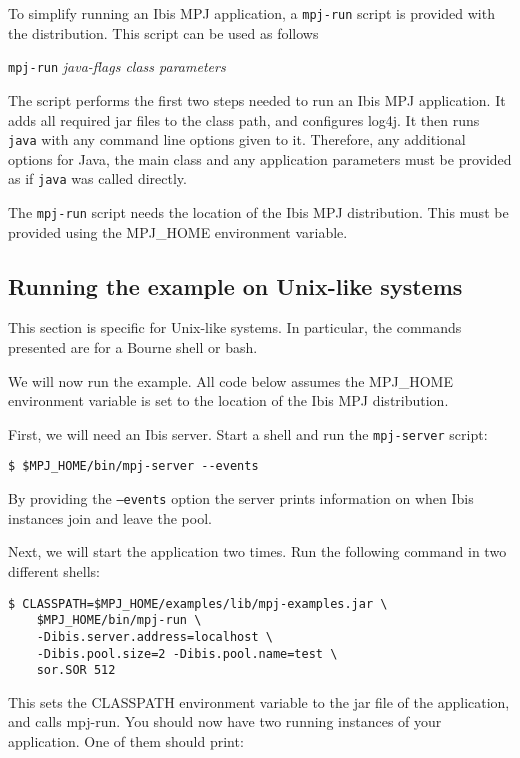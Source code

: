 \documentclass[a4paper,10pt]{article}
\begin{document}
To simplify running an Ibis MPJ application, a \texttt{mpj-run} script is
provided with the distribution. This script can be
used as follows

\begin{center}
\texttt{mpj-run} \emph{java-flags class parameters}
\end{center}

The script performs the first two steps needed to run an Ibis MPJ application.
It adds all required jar files
to the class path, and configures log4j.
It then runs \texttt{java} with any
command line options given to it. Therefore, any additional options for
Java, the main class and any application parameters must be provided as
if \texttt{java} was called directly.

The \texttt{mpj-run} script needs the location of the Ibis MPJ
distribution. This must be provided using the MPJ\_HOME environment
variable.

\subsection{Running the example on Unix-like systems}

This section is specific for Unix-like systems. In particular, the
commands presented are for a Bourne shell or bash.

We will now run the example. All code below assumes the MPJ\_HOME
environment variable is set to the location of the Ibis MPJ distribution.

First, we will need an Ibis server. Start a shell and
run the \texttt{mpj-server} script:
\noindent
{\small
\begin{verbatim}
$ $MPJ_HOME/bin/mpj-server --events
\end{verbatim}
}
\noindent

By providing the \texttt{--events} option the server
prints information on when Ibis instances join and leave the pool.

Next, we will start the application two times.
Run the following command in two different shells:

\noindent
{\small
\begin{verbatim}
$ CLASSPATH=$MPJ_HOME/examples/lib/mpj-examples.jar \
    $MPJ_HOME/bin/mpj-run \
    -Dibis.server.address=localhost \
    -Dibis.pool.size=2 -Dibis.pool.name=test \
    sor.SOR 512
\end{verbatim}
}
\noindent

This sets the CLASSPATH environment variable to the jar file of the
application, and calls mpj-run. You should now have two running
instances of your application. One of them should print:
\end{document}
